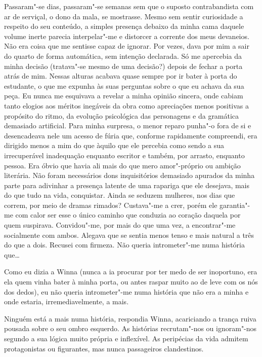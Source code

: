 Passaram"-se dias, passaram"-se semanas sem que o suposto contrabandista
com ar de serviçal, o dono da mala, se mostrasse. Mesmo sem sentir
curiosidade a respeito do seu conteúdo, a simples presença debaixo da
minha cama daquele volume inerte parecia interpelar"-me e distorcer a
corrente dos meus devaneios. Não era coisa que me sentisse capaz de
ignorar. Por vezes, dava por mim a sair do quarto de forma automática,
sem intenção declarada. Só me apercebia da minha decisão (tratava"-se
mesmo de uma decisão?) depois de fechar a porta atrás de mim. Nessas
alturas acabava quase sempre por ir bater à porta do estudante, o que me
expunha às suas perguntas sobre o que eu achava da sua peça. Eu nunca me
esquivava a revelar a minha opinião sincera, onde cabiam tanto elogios
aos méritos inegáveis da obra como apreciações menos positivas a
propósito do ritmo, da evolução psicológica das personagens e da
gramática demasiado artificial. Para minha surpresa, o menor reparo
punha"-o fora de si e desencadeava nele um acesso de fúria que,
conforme rapidamente compreendi, era dirigido menos a mim do que àquilo
que ele percebia como sendo a sua irrecuperável inadequação enquanto
escritor e também, por arrasto, enquanto pessoa. Era óbvio que havia ali
mais do que mero amor"-próprio ou ambição literária. Não foram
necessários dons inquisitórios demasiado apurados da minha parte para
adivinhar a presença latente de uma rapariga que ele desejava, mais do
que tudo
na vida, conquistar. Ainda se seduzem mulheres, nos dias que correm, por
meio de dramas rimados? Custava"-me a crer, porém ele garantia"-me com
calor ser esse o único caminho que conduzia ao coração daquela por quem
suspirava. Convidou"-me, por mais do que uma vez, a encontrar"-me socialmente com ambos.
Alegava que se sentia menos tenso e mais natural a três do que a dois.
Recusei com firmeza. Não queria intrometer"-me numa história
que\ldots{}

Como eu dizia a Winna (nunca a ia procurar por ter medo de ser
inoportuno, era ela quem vinha bater à minha porta, ou antes raspar
muito ao de leve com os nós dos dedos), eu não queria intrometer"-me numa
história que não era a minha e onde estaria, irremediavelmente, a mais.

Ninguém está a mais numa história, respondia Winna, acariciando a trança
ruiva pousada sobre o seu ombro esquerdo. As histórias recrutam"-nos ou
ignoram"-nos segundo a sua lógica muito própria e inflexível. As
peripécias da vida admitem protagonistas ou figurantes, mas nunca
passageiros clandestinos.

